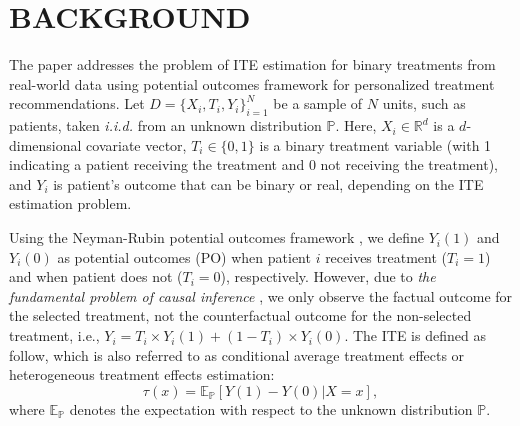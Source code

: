 \documentclass{article}
\begin{document}



\section{BACKGROUND}
\label{sec_problem}
The paper addresses the problem of ITE estimation for binary treatments from real-world data using potential outcomes framework \cite{rubin2005causal} for personalized treatment recommendations. Let $D = \lbrace X_i, T_i, Y_i \rbrace_{i=1}^N$ be a sample of $N$ units, such as patients, taken \textit{i.i.d.} from an unknown distribution $\mathbb{P}$. Here, $X_i \in \mathbb{R}^d$ is a $d$-dimensional covariate vector, $T_i \in \lbrace 0, 1 \rbrace$ is a binary treatment variable (with 1 indicating a patient receiving the treatment and 0 not receiving the treatment), and $Y_i$ is patient's outcome that can be binary or real, depending on the ITE estimation problem.

Using the Neyman-Rubin potential outcomes framework \cite{rubin2005causal}, we define $Y_i(1)$ and $Y_i(0)$ as potential outcomes (PO) when patient $i$ receives treatment ($T_i=1$) and when patient does not ($T_i=0$), respectively. However, due to \textit{the fundamental problem of causal inference} \cite{holland1986statistics}, we only observe the factual outcome for the selected treatment, not the counterfactual outcome for the non-selected treatment, i.e., $Y_i = T_i\times Y_i(1) + (1-T_i)\times Y_i(0)$. The ITE is defined as follow, which is also referred to as conditional average treatment effects or heterogeneous treatment effects estimation:
\begin{equation}
	\tau(x) = \mathbb{E}_\mathbb{P} \left[ Y(1) - Y(0) \vert X=x \right],
	\label{eq:cate}
\end{equation}
where $\mathbb{E}_\mathbb{P}$ denotes the expectation with respect to the unknown distribution $\mathbb{P}$.
\end{document}
